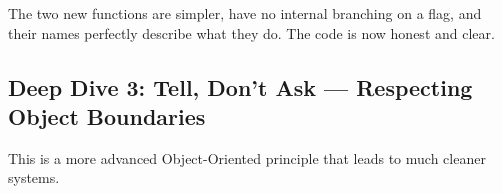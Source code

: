 \documentclass[
  letterpaper,
  DIV=11,
  numbers=noendperiod]{scrreprt}
\newenvironment{Shaded}{\begin{snugshade}}{\end{snugshade}}
\newcommand{\CharTok}[1]{\textcolor[rgb]{0.13,0.47,0.30}{#1}}
\newcommand{\OperatorTok}[1]{\textcolor[rgb]{0.37,0.37,0.37}{#1}}
\newcommand{\SpecialStringTok}[1]{\textcolor[rgb]{0.13,0.47,0.30}{#1}}
\begin{document}
\begin{itemize}
\begin{Shaded}
\end{Shaded}

  The two new functions are simpler, have no internal branching on a
  flag, and their names perfectly describe what they do. The code is now
  honest and clear.
\end{itemize}

\subsection{\texorpdfstring{\textbf{Deep Dive 3: Tell, Don't Ask ---
Respecting Object
Boundaries}}{Deep Dive 3: Tell, Don't Ask --- Respecting Object Boundaries}}\label{deep-dive-3-tell-dont-ask-respecting-object-boundaries}

This is a more advanced Object-Oriented principle that leads to much
cleaner systems.
\end{document}
